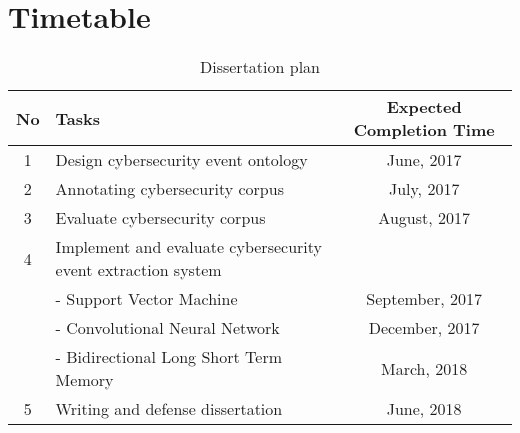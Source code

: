 \chapter{Timetable}
\thispagestyle{plain}

\label{Chapter6}

\begin{table}[h]

\begin{tabular}{ |c|l|c| } 
 \hline
No & Tasks & Expected Completion Time \\
\hline
1 & Design cybersecurity event ontology & June, 2017 \\
2 & Annotating cybersecurity corpus & July, 2017 \\
3 & Evaluate cybersecurity corpus & August, 2017 \\
4 & Implement and evaluate cybersecurity event extraction system & \\
 & - Support Vector Machine & September, 2017 \\
 & - Convolutional Neural Network & December, 2017 \\
 & - Bidirectional Long Short Term Memory & March, 2018 \\ 
5 & Writing and defense dissertation & June, 2018 \\
 \hline
\end{tabular}
\caption{Dissertation plan}
\label{table:61}

\end{table}


